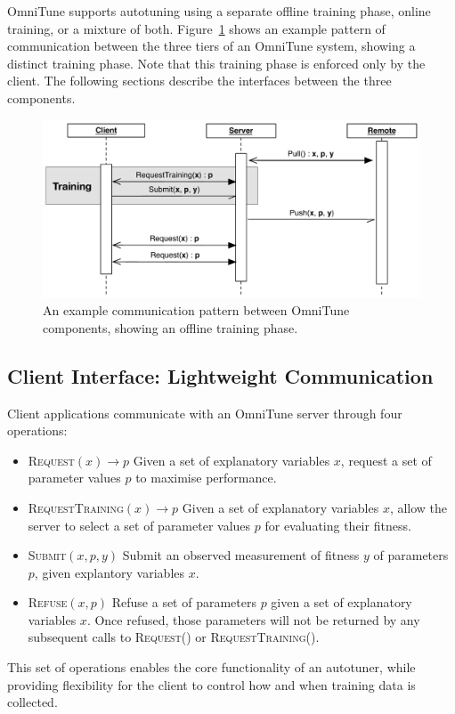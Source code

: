 OmniTune supports autotuning using a separate offline training phase,
online training, or a mixture of both. Figure~\ref{fig:omnitune-comms}
shows an example pattern of communication between the three tiers of
an OmniTune system, showing a distinct training phase. Note that this
training phase is enforced only by the client. The following sections
describe the interfaces between the three components.


\begin{figure}[b]
\centering
\includegraphics[width=.7\textwidth]{img/omnitune-comms}
\caption[Communication pattern between OmniTune components]{%
  An example communication pattern between OmniTune components,
  showing an offline training phase.%
}
\label{fig:omnitune-comms}
\end{figure}


\subsection{Client Interface: Lightweight Communication}

Client applications communicate with an OmniTune server through four
operations:
%
\begin{itemize}
\item \textsc{Request}$(x) \to p$ Given a set of explanatory variables
  $x$, request a set of parameter values $p$ to maximise performance.
\item \textsc{RequestTraining}$(x) \to p$ Given a set of explanatory
  variables $x$, allow the server to select a set of parameter values
  $p$ for evaluating their fitness.
\item \textsc{Submit}$(x, p, y)$ Submit an observed measurement of
  fitness $y$ of parameters $p$, given explantory variables $x$.
\item \textsc{Refuse}$(x, p)$ Refuse a set of parameters $p$ given a
  set of explanatory variables $x$. Once refused, those parameters
  will not be returned by any subsequent calls to \textsc{Request()}
  or \textsc{RequestTraining()}.
\end{itemize}
%
This set of operations enables the core functionality of an autotuner,
while providing flexibility for the client to control how and when
training data is collected.


